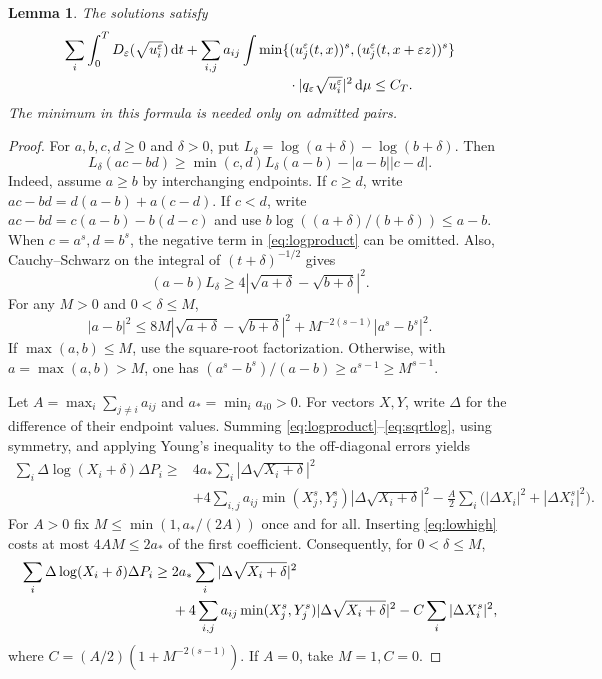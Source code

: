 \documentclass[11pt]{article}
\newtheorem{lemma}[theorem]{Lemma}
\newcommand{\eps}{\varepsilon}
\newcommand{\dd}{\,\mathrm d}
\newcommand{\De}{D_\eps}
\newcommand{\qe}{q_\eps}
\begin{document}
\begin{lemma}\label{lem:log}
The solutions satisfy
\begin{align}
 \sum_i\int_0^T\De(\sqrt{u_i^\eps})\dd t
 +\sum_{i,j}a_{ij}\int
 &\min\{(u_j^\eps(t,x))^s,(u_j^\eps(t,x+\eps z))^s\}\notag\\[-2pt]
 &\hspace{8mm}\cdot|\qe\sqrt{u_i^\eps}|^2\dd\mu\leq C_T.
 \label{eq:logbound}
\end{align}
The minimum in this formula is needed only on admitted pairs.
\end{lemma}
\begin{proof}
For $a,b,c,d\geq0$ and $\delta>0$, put
$L_\delta=\log(a+\delta)-\log(b+\delta)$. Then
\begin{equation}\label{eq:logproduct}
 L_\delta(ac-bd)\geq\min(c,d)L_\delta(a-b)-|a-b||c-d|.
\end{equation}
Indeed, assume $a\geq b$ by interchanging endpoints. If $c\geq d$, write
$ac-bd=d(a-b)+a(c-d)$. If $c<d$, write
$ac-bd=c(a-b)-b(d-c)$ and use
$b\log((a+\delta)/(b+\delta))\leq a-b$.
When $c=a^s,d=b^s$, the negative term in \eqref{eq:logproduct} can be omitted.
Also, Cauchy--Schwarz on the integral of $(t+\delta)^{-1/2}$ gives
\begin{equation}\label{eq:sqrtlog}
 (a-b)L_\delta\geq4|\sqrt{a+\delta}-\sqrt{b+\delta}|^2.
\end{equation}
For any $M>0$ and $0<\delta\leq M$,
\begin{equation}\label{eq:lowhigh}
 |a-b|^2\leq8M|\sqrt{a+\delta}-\sqrt{b+\delta}|^2
                     +M^{-2(s-1)}|a^s-b^s|^2.
\end{equation}
If $\max(a,b)\leq M$, use the square-root factorization. Otherwise, with
$a=\max(a,b)>M$, one has
$(a^s-b^s)/(a-b)\geq a^{s-1}\geq M^{s-1}$.

Let $A=\max_i\sum_{j\ne i}a_{ij}$ and $a_* =\min_i a_{i0}>0$.
For vectors $X,Y$, write $\Delta$ for the difference of their endpoint
values. Summing \eqref{eq:logproduct}--\eqref{eq:sqrtlog}, using symmetry,
and applying Young's inequality to the off-diagonal errors yields
\begin{align*}
 \sum_i\Delta\log(X_i+\delta)\Delta P_i
 \geq{}&4a_*\sum_i|\Delta\sqrt{X_i+\delta}|^2\\
 &+4\sum_{i,j}a_{ij}\min(X_j^s,Y_j^s)|\Delta\sqrt{X_i+\delta}|^2
       -\frac A2\sum_i\bigl(|\Delta X_i|^2+|\Delta X_i^s|^2\bigr).
\end{align*}
For $A>0$ fix $M\leq\min(1,a_*/(2A))$ once and for all. Inserting
\eqref{eq:lowhigh} costs at most $4AM\leq2a_*$ of the first coefficient.
Consequently, for $0<\delta\leq M$,
\begin{align}
 \sum_i\Delta\log(X_i+\delta)\Delta P_i
 \geq{}&2a_*\sum_i|\Delta\sqrt{X_i+\delta}|^2\notag\\
 &+4\sum_{i,j}a_{ij}\min(X_j^s,Y_j^s)|\Delta\sqrt{X_i+\delta}|^2
        -C\sum_i|\Delta X_i^s|^2,\label{eq:logcoercive}
\end{align}
where $C=(A/2)(1+M^{-2(s-1)})$. If $A=0$, take $M=1,C=0$.


\end{proof}
\end{document}
